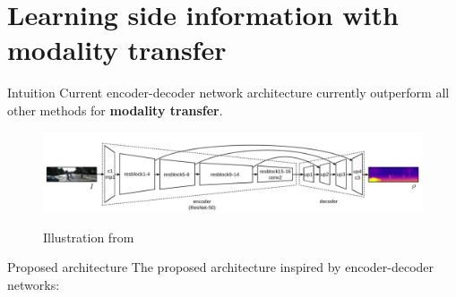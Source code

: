 \section{Learning side information with modality transfer}

\label{subsec:modality}

\begin{frame}{Intuition}
	\vfill
	Current encoder-decoder network architecture currently outperform all other methods for \textbf{modality transfer}.
	\vfill
	\begin{figure}
		\centering
		\includegraphics[width=\linewidth]{images/depth_inference/kusnietzov.png}
		
		Illustration from~\cite{Kuznietsov2017}
	\end{figure}
	\vfill
\end{frame}


\begin{frame}{Proposed architecture}
	\vfill
	The proposed architecture inspired by encoder-decoder networks:
	\vfill
	\begin{figure}
		\centering
		\end{figure}
	\vfill
\end{frame}


